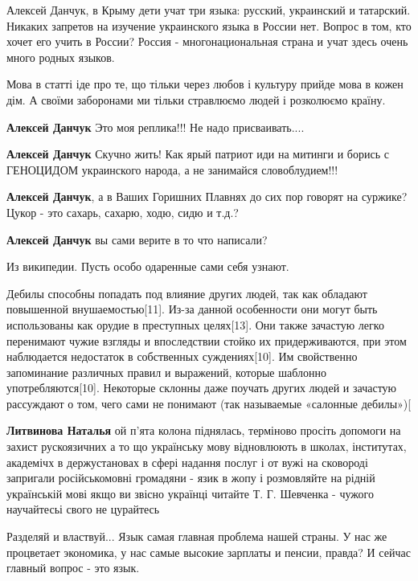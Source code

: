 \begin{itemize}
\begin{itemize}

Алексей Данчук, в Крыму дети учат три языка: русский, украинский и татарский.
Никаких запретов на изучение украинского языка в России нет. Вопрос в том, кто
хочет его учить в России? Россия - многонациональная страна и учат здесь очень
много родных языков.

Мова в статті іде про те, що тільки через любов і культуру прийде мова в кожен
дім. А своїми заборонами ми тільки стравлюємо людей і розколюємо країну.

\textbf{Алексей Данчук} Это моя реплика!!! Не надо присваивать....

\textbf{Алексей Данчук} Скучно жить! Как ярый патриот иди на митинги и борись с
ГЕНОЦИДОМ украинского народа, а не занимайся словоблудием!!!

\textbf{Алексей Данчук}, а в Ваших Горишних Плавнях до сих пор говорят на
суржике? Цукор - это сахарь, сахарю, ходю, сидю и т.д.?


\textbf{Алексей Данчук} вы сами верите в то что написали?

Из википедии. Пусть особо одаренные сами себя узнают.

Дебилы способны попадать под влияние других людей, так как обладают повышенной
внушаемостью[11]. Из-за данной особенности они могут быть использованы как
орудие в преступных целях[13]. Они также зачастую легко перенимают чужие
взгляды и впоследствии стойко их придерживаются, при этом наблюдается
недостаток в собственных суждениях[10]. Им свойственно запоминание различных
правил и выражений, которые шаблонно употребляются[10]. Некоторые склонны даже
поучать других людей и зачастую рассуждают о том, чего сами не понимают (так
называемые «салонные дебилы»)[

\textbf{Литвинова Наталья} ой п'ята колона піднялась, терміново просіть
допомоги на захист рускоязичних а то що українську мову відновлюють в школах,
інститутах, академічх в держустановах в сфері надання послуг і от вужі на
сковороді запригали російськомовні громадяни - язик в жопу і розмовляйте на
рідній українській мові якщо ви звісно українці читайте Т. Г. Шевченка - чужого
научайтесьі свого не цурайтесь

\end{itemize}


Разделяй и властвуй... Язык самая главная проблема нашей страны. У нас же
процветает экономика, у нас самые высокие зарплаты и пенсии, правда? И сейчас
главный вопрос - это язык.


\end{itemize}

